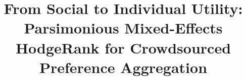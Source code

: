 \documentclass[10pt,journal,cspaper,compsoc]{IEEEtran}
\begin{document}
%
\title{From Social to Individual Utility: Parsimonious Mixed-Effects HodgeRank for Crowdsourced Preference Aggregation}
%
%
%
%
%
%
\end{document}
